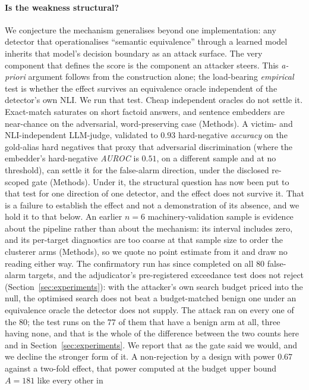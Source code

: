 \paragraph{Is the weakness structural?}
We conjecture the mechanism generalises beyond one implementation: any detector that
operationalises ``semantic equivalence'' through a learned model inherits that
model's decision boundary as an attack surface. The very component that defines the
score is the component an attacker steers. This \emph{a-priori} argument follows from
the construction alone; the load-bearing \emph{empirical} test is whether the effect
survives an equivalence oracle independent of the detector's own NLI. We run that test.
Cheap independent oracles do not settle it. Exact-match saturates on short factoid
answers, and sentence embedders are near-chance on the adversarial, word-preserving case
(Methods). A victim- and NLI-independent LLM-judge, validated to $0.93$ hard-negative \emph{accuracy}
on the gold-alias hard negatives that proxy that adversarial discrimination (where the
embedder's hard-negative \emph{AUROC} is $0.51$, on a different sample and at no
threshold), can settle it for the false-alarm direction, under the disclosed
re-scoped gate (Methods). Under it, the structural question has now been put to that test
for one direction of one detector, and the effect does not survive it. That is a failure to
establish the effect and not a demonstration of its absence, and we hold it to that below.
An earlier $n{=}6$
machinery-validation sample is evidence about the pipeline rather than about the mechanism:
its interval includes zero, and its per-target diagnostics are too coarse at that sample size
to order the clusterer arms (Methods), so we quote no point estimate from it and draw no
reading either way. The confirmatory run has since completed on all $80$ false-alarm
targets, and the adjudicator's pre-registered exceedance test does not reject
(Section~\ref{sec:experiments}): with the attacker's own search budget priced into the null,
the optimised search does not beat a budget-matched benign one under an equivalence oracle
the detector does not supply. The attack ran on every one of the $80$; the test runs on the
$77$ of them that have a benign arm at all, three having none, and that is the whole of the
difference between the two counts here and in Section~\ref{sec:experiments}. We report that as
the gate said we would, and we decline the
stronger form of it. A non-rejection by a design with power $0.67$ against a two-fold effect,
that power computed at the budget upper bound $A{=}181$ like every other in
